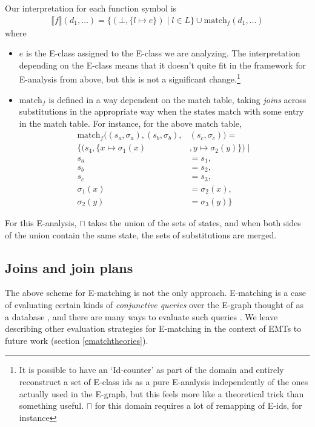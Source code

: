 \documentclass[12pt,a4paper,twoside,openright]{report}
\numberwithin{equation}{chapter}		%
\numberwithin{figure}{chapter}			%
\numberwithin{table}{chapter}			%
\theoremstyle{definition}
\theoremstyle{plain}
\begin{document}
Our interpretation for each function symbol is
\begin{align*}
	\llbracket f \rrbracket (d_1, \ldots) = \{(\bot, \{l \mapsto e\}) \mid l \in L\} \cup
		\textrm{match}_f(d_1, \ldots)
\end{align*}
where
\begin{itemize}
	\item $e$ is the E-class assigned to the E-class we are analyzing. The interpretation depending on the E-class means that it doesn't quite fit in the framework for E-analysis from above, but this is not a significant change.\footnote{It is possible to have an `Id-counter' as part of the domain and entirely reconstruct a set of E-class ids as a pure E-analysis independently of the ones actually used in the E-graph, but this feels more like a theoretical trick than something useful. $\sqcap$ for this domain requires a lot of remapping of E-ids, for instance}
 \item $\textrm{match}_f$ is defined in a way dependent on the match table, taking \emph{joins} across substitutions in the appropriate way when the states match with some entry in the match table. For instance, for the above match table,
 \begin{align*}
 \textrm{match}_f((s_a, \sigma_a), (s_b, \sigma_b), &(s_c, \sigma_c)) = \\ \{(s_4, \{x \mapsto \sigma_1(x)&, y \mapsto \sigma_2(y)\}) \mid \\ s_a &= s_1, \\ s_b &= s_2, \\ s_c &= s_3, \\ \sigma_1(x) &= \sigma_2(x), \\ \sigma_2(y) &= \sigma_3(y) \}
 \end{align*}
\end{itemize}

For this E-analysis, $\sqcap$ takes the union of the sets of states, and when both sides of the union contain the same state, the sets of substitutions are merged.


\subsection{Joins and join plans}
The above scheme for E-matching is not the only approach. E-matching is a case of evaluating certain kinds of \emph{conjunctive queries} over the E-graph thought of as a database \cite{zhang_relational_2022}, and there are many ways to evaluate such queries  \cite{wang_free_2023}. We leave describing other evaluation strategies for E-matching in the context of EMTs to future work (section \ref{ematchtheories}).
\end{document}
